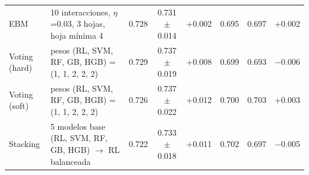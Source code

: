 \begin{table}[t]
\begin{tabular}{@{}p{2.6cm}p{6.5cm}cccccc@{}}
EBM & 10 interacciones, $\eta$=0.03, 3 hojas, hoja mínima 4 & 0.728 & 0.731$\pm$0.014 & +0.002 & 0.695 & 0.697 & +0.002 \\
Voting (hard) & pesos (RL, SVM, RF, GB, HGB) = (1, 1, 2, 2, 2) & 0.729 & 0.737$\pm$0.019 & +0.008 & 0.699 & 0.693 & $-$0.006 \\
Voting (soft) & pesos (RL, SVM, RF, GB, HGB) = (1, 1, 2, 2, 2) & 0.726 & 0.737$\pm$0.022 & +0.012 & 0.700 & 0.703 & +0.003 \\
Stacking & 5 modelos base (RL, SVM, RF, GB, HGB) $\rightarrow$ RL balanceada & 0.722 & 0.733$\pm$0.018 & +0.011 & 0.702 & 0.697 & $-$0.005 \\
\bottomrule
\end{tabular}
\end{table}
